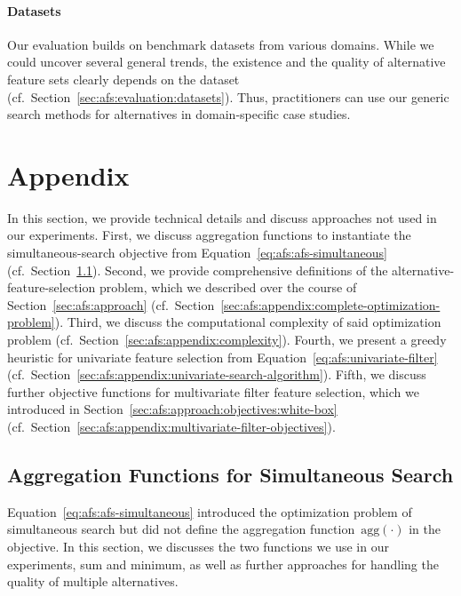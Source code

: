 \documentclass{article}
\theoremstyle{definition}
\begin{document}
\paragraph{Datasets}

Our evaluation builds on benchmark datasets from various domains.
While we could uncover several general trends, the existence and the quality of alternative feature sets clearly depends on the dataset (cf.~Section~\ref{sec:afs:evaluation:datasets}).
Thus, practitioners can use our generic search methods for alternatives in domain-specific case studies.

\appendix

\section{Appendix}
\label{sec:afs:appendix}

In this section, we provide technical details and discuss approaches not used in our experiments.
First, we discuss aggregation functions to instantiate the simultaneous-search objective from Equation~\ref{eq:afs:afs-simultaneous} (cf.~Section~\ref{sec:afs:appendix:simultaneous-objective-aggregation}).
Second, we provide comprehensive definitions of the alternative-feature-selection problem, which we described over the course of Section~\ref{sec:afs:approach} (cf.~Section~\ref{sec:afs:appendix:complete-optimization-problem}).
Third, we discuss the computational complexity of said optimization problem (cf.~Section~\ref{sec:afs:appendix:complexity}).
Fourth, we present a greedy heuristic for univariate feature selection from Equation~\ref{eq:afs:univariate-filter} (cf.~Section~\ref{sec:afs:appendix:univariate-search-algorithm}).
Fifth, we discuss further objective functions for multivariate filter feature selection, which we introduced in Section~\ref{sec:afs:approach:objectives:white-box} (cf.~Section~\ref{sec:afs:appendix:multivariate-filter-objectives}).

\subsection{Aggregation Functions for Simultaneous Search}
\label{sec:afs:appendix:simultaneous-objective-aggregation}

Equation~\ref{eq:afs:afs-simultaneous} introduced the optimization problem of simultaneous search but did not define the aggregation function~$\text{agg}(\cdot)$ in the objective.
In this section, we discusses the two functions we use in our experiments, sum and minimum, as well as further approaches for handling the quality of multiple alternatives.
\end{document}

